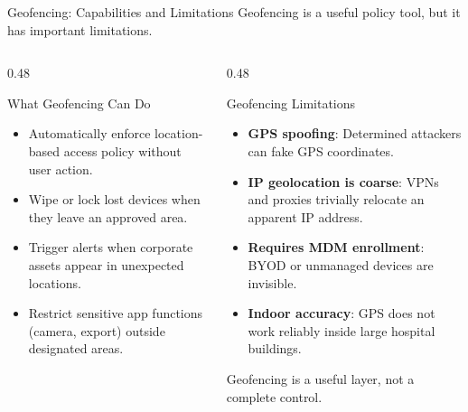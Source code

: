 \documentclass[aspectratio=169]{beamer}  %
\begin{document}

\begin{frame}{Geofencing: Capabilities and Limitations}
    \footnotesize
    Geofencing is a useful policy tool, but it has important limitations.

    \vspace{0.3em}
    \begin{columns}[T]
        \begin{column}{0.48\textwidth}
            \begin{block}{What Geofencing Can Do}
                \footnotesize
                \begin{itemize}
                    \item Automatically enforce location-based access policy without user action.
                    \item Wipe or lock lost devices when they leave an approved area.
                    \item Trigger alerts when corporate assets appear in unexpected locations.
                    \item Restrict sensitive app functions (camera, export) outside designated areas.
                \end{itemize}
            \end{block}
        \end{column}
        \begin{column}{0.48\textwidth}
            \begin{alertblock}{Geofencing Limitations}
                \footnotesize
                \begin{itemize}
                    \item \textbf{GPS spoofing}: Determined attackers can fake GPS coordinates.
                    \item \textbf{IP geolocation is coarse}: VPNs and proxies trivially relocate an apparent IP address.
                    \item \textbf{Requires MDM enrollment}: BYOD or unmanaged devices are invisible.
                    \item \textbf{Indoor accuracy}: GPS does not work reliably inside large hospital buildings.
                \end{itemize}
                Geofencing is a useful layer, not a complete control.
            \end{alertblock}
        \end{column}
    \end{columns}
\end{frame}
\end{document}
